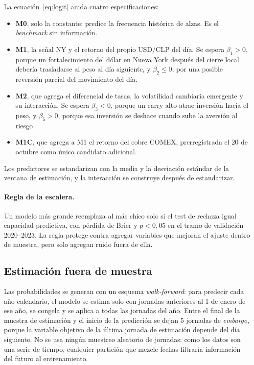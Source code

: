 \documentclass[11pt,a4paper]{article}
\begin{document}
La ecuación~\eqref{eq:logit} anida cuatro especificaciones:
\begin{itemize}\itemsep2pt
\item \textbf{M0}, solo la constante: predice la frecuencia histórica de alzas. Es el \emph{benchmark} sin información.
\item \textbf{M1}, la señal NY y el retorno del propio USD/CLP del día. Se espera \(\beta_1>0\), porque un fortalecimiento del dólar en Nueva York después del cierre local debería trasladarse al peso al día siguiente, y \(\beta_2\le0\), por una posible reversión parcial del movimiento del día.
\item \textbf{M2}, que agrega el diferencial de tasas, la volatilidad cambiaria emergente y su interacción. Se espera \(\beta_3<0\), porque un carry alto atrae inversión hacia el peso, y \(\beta_5>0\), porque esa inversión se deshace cuando sube la aversión al riesgo \citep{brunnermeier2008}.
\item \textbf{M1C}, que agrega a M1 el retorno del cobre COMEX, prerregistrada el 20 de octubre como único candidato adicional.
\end{itemize}
Los predictores se estandarizan con la media y la desviación estándar de la ventana de estimación, y la interacción se construye después de estandarizar.

\paragraph{Regla de la escalera.} Un modelo más grande reemplaza al más chico solo si el test de \citet{clark2007} rechaza igual capacidad predictiva, con pérdida de Brier y \(p<0{,}05\) en el tramo de validación 2020--2023. La regla protege contra agregar variables que mejoran el ajuste dentro de muestra, pero solo agregan ruido fuera de ella.

\subsection{Estimación fuera de muestra}
Las probabilidades se generan con un esquema \emph{walk-forward}: para predecir cada año calendario, el modelo se estima solo con jornadas anteriores al 1 de enero de ese año, se congela y se aplica a todas las jornadas del año. Entre el final de la muestra de estimación y el inicio de la predicción se dejan 5 jornadas de \emph{embargo}, porque la variable objetivo de la última jornada de estimación depende del día siguiente. No se usa ningún muestreo aleatorio de jornadas: como los datos son una serie de tiempo, cualquier partición que mezcle fechas filtraría información del futuro al entrenamiento.
\end{document}
